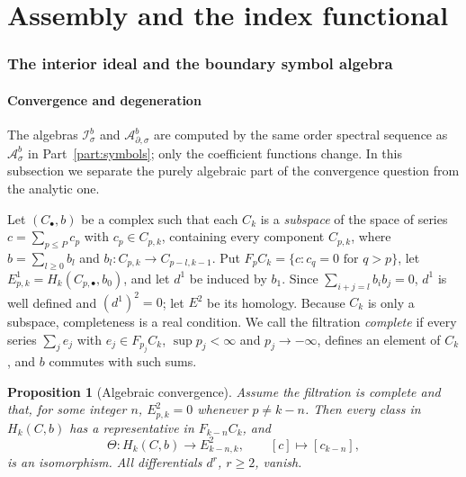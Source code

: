 \documentclass[11pt,oneside,reqno]{article}
\newcommand{\Isb}{\mathcal I^b_\sigma}
\newcommand{\Asb}{\mathcal A^b_\sigma}
\newcommand{\Adsb}{\mathcal A^b_{\partial,\sigma}}
\theoremstyle{plain}
\newtheorem{proposition}[theorem]{Proposition}
\theoremstyle{definition}
\theoremstyle{remark}
\begin{document}
\part{Assembly and the index functional}\label{part:assembly}

\section{The interior ideal and the boundary symbol algebra}\label{sec:Is}

\subsection{Convergence and degeneration}\label{subsec:conv}
The algebras \(\Isb\) and \(\Adsb\) are computed by the same order spectral
sequence as \(\Asb\) in Part~\ref{part:symbols}; only the coefficient
functions change. In this subsection we separate the purely algebraic part
of the convergence question from the analytic one.

Let \((C_\bullet,b)\) be a complex such that each \(C_k\) is a
\emph{subspace} of the space of series \(c=\sum_{p\leq P}c_p\) with
\(c_p\in C_{p,k}\), containing every component \(C_{p,k}\), where \(b=\sum_{l\geq0}b_l\)
and \(b_l:C_{p,k}\to C_{p-l,k-1}\). Put \(F_pC_k=\{c:c_q=0\text{ for }q>p\}\),
let \(E^1_{p,k}=H_k(C_{p,\bullet},b_0)\), and let \(d^1\) be induced by
\(b_1\). Since \(\sum_{i+j=l}b_ib_j=0\), \(d^1\) is well defined and
\((d^1)^2=0\); let \(E^2\) be its homology. Because \(C_k\) is only a subspace, completeness is a real condition.
We call the filtration
\emph{complete} if every series \(\sum_je_j\) with \(e_j\in F_{p_j}C_k\),
\(\sup p_j<\infty\) and \(p_j\to-\infty\), defines an element of \(C_k\), and
\(b\) commutes with such sums.

\begin{proposition}[Algebraic convergence]\label{prop:algconv}
Assume the filtration is complete and that, for some integer \(n\),
\(E^2_{p,k}=0\) whenever \(p\neq k-n\). Then every class in \(H_k(C,b)\)
has a representative in \(F_{k-n}C_k\), and
\[
 \Theta:H_k(C,b)\to E^2_{k-n,k},\qquad[c]\mapsto[c_{k-n}],
\]
is an isomorphism. All differentials \(d^r\), \(r\geq2\), vanish.
\end{proposition}
\end{document}
